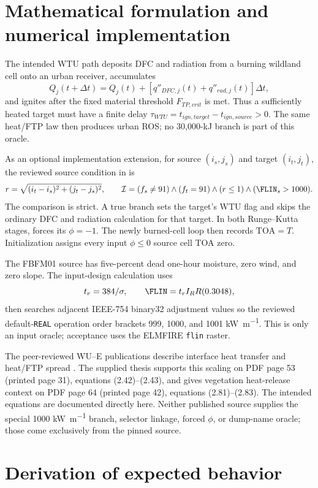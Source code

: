 \section{Mathematical formulation and numerical implementation}

The intended WTU path deposits DFC and radiation from a burning wildland cell
onto an urban receiver, accumulates
\[
 Q_j(t+\Delta t)=Q_j(t)+[q''_{DFC,j}(t)+q''_{rad,j}(t)]\Delta t,
\]
and ignites after the fixed material threshold $F_{TP,crit}$ is met. Thus a
sufficiently heated target must have a finite delay
$\tau_{WTU}=t_{ign,target}-t_{ign,source}>0$. The same heat/FTP law then
produces urban ROS; no 30,000-kJ branch is part of this oracle.

As an optional implementation extension, for source \((i_s,j_s)\) and target \((i_t,j_t)\), the reviewed source condition
in  is
\[
 r=\sqrt{(i_t-i_s)^2+(j_t-j_s)^2},\qquad
 \mathcal I=(f_s\ne91)\land(f_t=91)\land(r\le1)
             \land(\FLIN_s>1000).
\]
The comparison is strict.  A true branch sets the target's WTU flag and skips
the ordinary DFC and radiation calculation for that target.  In both Runge--Kutta
stages,  forces its
\(\phi=-1\).  The newly burned-cell loop then records
\(\mathrm{TOA}=T\).  Initialization assigns every input \(\phi\le0\) source
cell TOA zero.

The FBFM01 source has five-percent dead one-hour moisture, zero wind, and zero
slope.  The input-design calculation uses
\[
 t_r=384/\sigma,\qquad \FLIN=t_r I_R R(0.3048),
\]
then searches adjacent IEEE-754 binary32 adjustment values so the reviewed
default-\texttt{REAL} operation order brackets 999, 1000, and 1001
\si{\kilo\watt\per\metre}.  This is only an input oracle; acceptance uses the
ELMFIRE \texttt{flin} raster.

The peer-reviewed WU--E publications describe interface heat transfer and
heat/FTP spread \cite{PurnomoPCI2024,PurnomoIJWF2024}. The supplied thesis supports
this scaling on PDF page 53 (printed page 31), equations (2.42)--(2.43), and
gives vegetation heat-release context on PDF page 64 (printed page 42),
equations (2.81)--(2.83). The intended equations are documented directly here.
Neither published source supplies the special 1000 \si{\kilo\watt\per\metre} branch,
selector linkage, forced \(\phi\), or dump-name oracle; those come exclusively
from the pinned source.

\section{Derivation of expected behavior}

